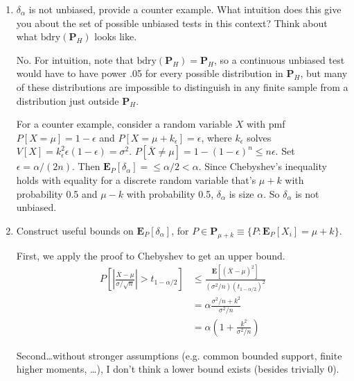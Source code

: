 \documentclass[12pt,english]{article}
\begin{document}
\begin{enumerate}
\begin{enumerate}
		\vspace{1em}
		\item $\delta_{\alpha}$ is not unbiased, provide a counter example. What intuition does this give you about the set of possible unbiased tests in this context? Think about what $\text{bdry}(\mathbf{P}_{H})$ looks like.
		\vspace{1em}
		
		No. For intuition, note that $\text{bdry}(\mathbf{P}_{H}) = \mathbf{P}_{H}$, so a continuous unbiased test would have to have power .05 for every possible distribution in $\mathbf{P}_{H}$, but many of these distributions are impossible to distinguish in any finite sample from a distribution just outside $\mathbf{P}_{H}$.
		
		For a counter example, consider a random variable $X$ with pmf $P[X = \mu] = 1 - \epsilon$ and $P[X = \mu + k_{\epsilon}] = \epsilon$, where $k_{\epsilon}$ solves $V[X] = k_{\epsilon}^{2}\epsilon(1 - \epsilon) = \sigma^{2}$. $P[\overline{X} \neq \mu] = 1 - (1 - \epsilon)^{n} \leq n\epsilon$. Set $\epsilon = \alpha / (2n)$. Then $\mathbf{E}_{P}[\delta_{\alpha}] = \leq \alpha/2 < \alpha$. Since Chebyshev's inequality holds with equality for a discrete random variable that's $\mu + k$ with probability 0.5 and $\mu - k$ with probability 0.5, $\delta_{\alpha}$ is size $\alpha$. So $\delta_{\alpha}$ is not unbiased.
		
		\vspace{1em}
		\item Construct useful bounds on $\mathbf{E}_{P}[\delta_{\alpha}]$, for $P \in \mathbf{P}_{\mu + k} \equiv \{ P : \mathbf{E}_{P}[X_{i}] = \mu + k \}$.
		\vspace{1em}
		
		First, we apply the proof to Chebyshev to get an upper bound.
		\begin{align*}
		P\left[ \left| \frac{\overline{X} - \mu}{\sigma / \sqrt{n}} \right| > t_{1 - \alpha/2} \right] & \leq \frac{\mathbf{E}[(\overline{X} - \mu)^{2}]}{(\sigma^{2} / n) (t_{1 - \alpha/2})^{2}} \\
		& = \alpha \frac{\sigma^{2}/n + k^{2}}{\sigma^{2}/n} \\
		& = \alpha (1 + \frac{k^{2}}{\sigma^{2} / n})
		\end{align*}
		
		Second\ldots without stronger assumptions (e.g. common bounded support, finite higher moments, \ldots), I don't think a lower bound exists (besides trivially 0).	
	
	\end{enumerate}
\end{enumerate}
\end{document}

